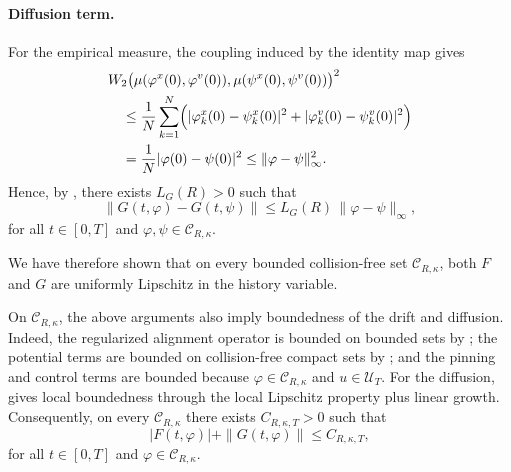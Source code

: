 \documentclass[pdflatex,sn-mathphys-num]{sn-jnl}%
\numberwithin{equation}{section}
\theoremstyle{thmstyleone}%
\theoremstyle{remark}
\theoremstyle{definition}
\newcommand{\calU}{\mathcal{U}}
\begin{document}
\paragraph{Diffusion term.}
For the empirical measure, the coupling induced by the identity map gives
\begin{equation*}
\begin{aligned}
  &W_2\bigl(\mu(\varphi^x(0),\varphi^v(0)),
           \mu(\psi^x(0),\psi^v(0))\bigr)^2 \\
  &\quad \le \frac1N \sum_{k=1}^N \Bigl( |\varphi_k^x(0)-\psi_k^x(0)|^2
    + |\varphi_k^v(0)-\psi_k^v(0)|^2 \Bigr) \\
  &\quad = \frac{1}{N}|\varphi(0)-\psi(0)|^2
  \le \|\varphi-\psi\|_\infty^2.
\end{aligned}
\end{equation*}
Hence, by , there exists $L_G(R)>0$ such that
\[
  \|G(t,\varphi)-G(t,\psi)\|
  \le L_G(R)\,\|\varphi-\psi\|_\infty,
\]
for all $t\in[0,T]$ and $\varphi,\psi\in\mathcal C_{R,\kappa}$.

We have therefore shown that on every bounded collision-free set
$\mathcal C_{R,\kappa}$, both $F$ and $G$ are uniformly Lipschitz in the
history variable.

On $\mathcal C_{R,\kappa}$, the above arguments also imply boundedness of
the drift and diffusion. Indeed, the regularized alignment operator is
bounded on bounded sets by ; the potential terms are
bounded on collision-free compact sets by ; and the pinning
and control terms are bounded because $\varphi\in\mathcal C_{R,\kappa}$
and $u\in\calU_T$. For the diffusion,  gives local
boundedness through the local Lipschitz property plus linear growth.
Consequently, on every $\mathcal C_{R,\kappa}$ there exists
$C_{R,\kappa,T}>0$ such that
\[
  |F(t,\varphi)| + \|G(t,\varphi)\|
  \le C_{R,\kappa,T},
\]
for all $t\in[0,T]$ and $\varphi\in\mathcal C_{R,\kappa}$.
\end{document}

